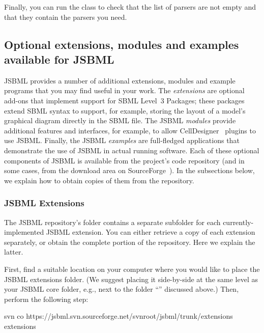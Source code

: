 Finally, you can run the  class to check that the list of
parsers are not empty and that they contain the parsers you need.


\subsection{Optional extensions, modules and examples available for JSBML}
\label{sec:dependencies}

JSBML provides a number of additional extensions, modules and example
programs that you may find useful in your work.  The \emph{extensions} are
optional add-ons that implement support for SBML Level~3 Packages; these
packages extend SBML syntax to support, for example, storing the layout of
a model's graphical diagram directly in the SBML file.  The JSBML
\emph{modules} provide additional features and interfaces, for example, to
allow CellDesigner~\cite{Funahashi2003} plugins to use JSBML.  Finally, the
JSBML \emph{examples} are full-fledged applications that demonstrate the
use of JSBML in actual running software.  Each of these optional components
of JSBML is available from the project's code repository (and in some
cases, from the download area on SourceForge~\cite{JSBMLdownload}).  In the
subsections below, we explain how to obtain copies of them from the
repository.


\subsubsection{JSBML Extensions}

The JSBML repository's  folder contains a separate
subfolder for each currently-implemented JSBML extension. You can either
retrieve a copy of each extension separately, or obtain the complete
 portion of the repository.  Here we explain the latter.

First, find a suitable location on your computer where you would like to
place the JSBML extensions folder.  (We suggest placing it side-by-side at
the same level as your JSBML core folder, e.g., next to the folder
``\dirname'' discussed above.)  Then, perform the following step:

\begin{example}[style=bash, title={Downloading the latest JSBML extensions
    source folder from the project's Subversion repository.}] 
svn co https://jsbml.svn.sourceforge.net/svnroot/jsbml/trunk/extensions extensions
\end{example}

